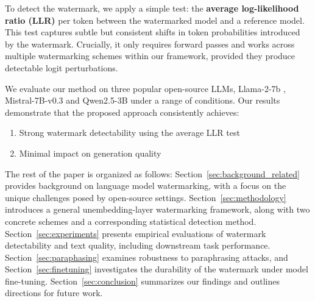 To detect the watermark, we apply a simple test: the \textbf{average log-likelihood ratio (LLR)} per token between the watermarked model and a reference model. This test captures subtle but consistent shifts in token probabilities introduced by the watermark. Crucially, it only requires forward passes and works across multiple watermarking schemes within our framework, provided they produce detectable logit perturbations.

We evaluate our method on three popular open-source LLMs, Llama-2-7b \citet{touvron2023llama}, Mistral-7B-v0.3 \citet{jiang2023mistral7b} and Qwen2.5-3B \citet{qwen2025qwen25technicalreport} under a range of conditions. Our results demonstrate that the proposed approach consistently achieves:

\begin{enumerate}

    \item Strong watermark detectability using the average LLR test

    \item Minimal impact on generation quality

\end{enumerate}

The rest of the paper is organized as follows: Section~\ref{sec:background_related} provides background on language model watermarking, with a focus on the unique challenges posed by open-source settings. Section~\ref{sec:methodology} introduces a general unembedding-layer watermarking framework, along with two concrete schemes and a corresponding statistical detection method. Section~\ref{sec:experiments} presents empirical evaluations of watermark detectability and text quality, including downstream task performance. Section~\ref{sec:paraphasing} examines robustness to paraphrasing attacks, and Section~\ref{sec:finetuning} investigates the durability of the watermark under model fine-tuning. Section~\ref{sec:conclusion} summarizes our findings and outlines directions for future work.